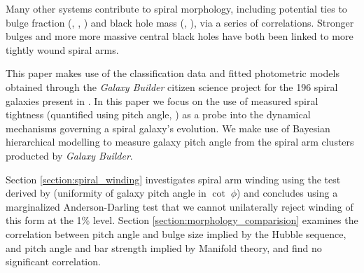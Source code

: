 Many other systems contribute to spiral morphology, including potential ties to bulge fraction (\citealt{1975A&A....44..363Y}, \citealt{2013MNRAS.436.1074S}, \citealt{2019MNRAS.487.1808M}) and black hole mass (\citealt{2015PhDT........14D}, \citealt{2017MNRAS.471.2187D}), via a series of correlations. Stronger bulges and more more massive central black holes have both been linked to more tightly wound spiral arms.

This paper makes use of the classification data and fitted photometric models obtained through the \textit{Galaxy Builder} citizen science project for the 196 spiral galaxies present in \Lingard. In this paper we focus on the use of measured spiral tightness (quantified using pitch angle, \citealt{1987gady.book.....B}) as a probe into the dynamical mechanisms governing a spiral galaxy's evolution. We make use of Bayesian hierarchical modelling to measure galaxy pitch angle from the spiral arm clusters producted by \textit{Galaxy Builder}.

Section \ref{section:spiral_winding} investigates spiral arm winding using the test derived by \cite{2019arXiv190910291P} (uniformity of galaxy pitch angle in $\cot\;\phi$) and concludes using a marginalized Anderson-Darling test that we cannot unilaterally reject winding of this form at the 1\% level. Section \ref{section:morphology_comparision} examines the correlation between pitch angle and bulge size implied by the Hubble sequence, and pitch angle and bar strength implied by Manifold theory, and find no significant correlation.
